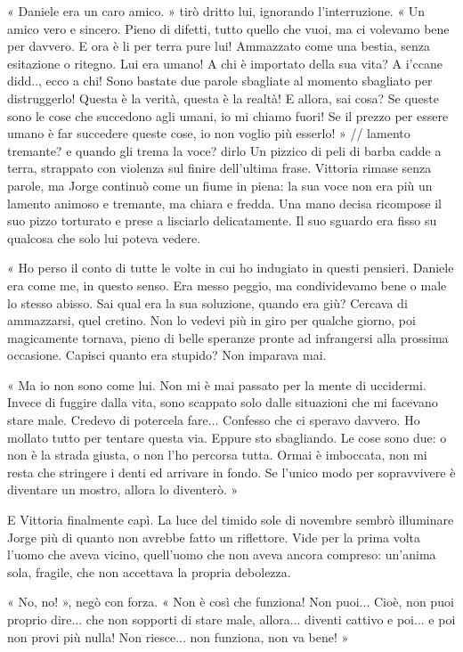 « Daniele era un caro amico. » tirò dritto lui, ignorando l'interruzione. « Un amico vero e sincero. Pieno di difetti, tutto quello che vuoi, ma ci volevamo bene per davvero. E ora è li per terra pure lui! Ammazzato come una bestia, senza esitazione o ritegno. Lui era umano! A chi è importato della sua vita? A i'ccane didd.., ecco a chi! Sono bastate due parole sbagliate al momento sbagliato per distruggerlo! Questa è la verità, questa è la realtà! E allora, sai cosa? Se queste sono le cose che succedono agli umani, io mi chiamo fuori! Se il prezzo per essere umano è far succedere queste cose, io non voglio più esserlo! »
// lamento tremante? e quando gli trema la voce? dirlo
Un pizzico di peli di barba cadde a terra, strappato con violenza sul finire dell'ultima frase. Vittoria rimase senza parole, ma Jorge continuò come un fiume in piena: la sua voce non era più un lamento animoso e tremante, ma chiara e fredda. Una mano decisa ricompose il suo pizzo torturato e prese a lisciarlo delicatamente. Il suo sguardo era fisso su qualcosa che solo lui poteva vedere.

« Ho perso il conto di tutte le volte in cui ho indugiato in questi pensieri. Daniele era come me, in questo senso. Era messo peggio, ma condividevamo bene o male lo stesso abisso. Sai qual era la sua soluzione, quando era giù? Cercava di ammazzarsi, quel cretino. Non lo vedevi più in giro per qualche giorno, poi magicamente tornava, pieno di belle speranze pronte ad infrangersi alla prossima occasione. Capisci quanto era stupido? Non imparava mai.

« Ma io non sono come lui. Non mi è mai passato per la mente di uccidermi. Invece di fuggire dalla vita, sono scappato solo dalle situazioni che mi facevano stare male. Credevo di potercela fare... Confesso che ci speravo davvero. Ho mollato tutto per tentare questa via. Eppure sto sbagliando. Le cose sono due: o non è la strada giusta, o non l'ho percorsa tutta. Ormai è imboccata, non mi resta che stringere i denti ed arrivare in fondo. Se l'unico modo per sopravvivere è diventare un mostro, allora lo diventerò. »

E Vittoria finalmente capì. La luce del timido sole di novembre sembrò illuminare Jorge più di quanto non avrebbe fatto un riflettore. Vide per la prima volta l'uomo che aveva vicino, quell'uomo che non aveva ancora compreso: un'anima sola, fragile, che non accettava la propria debolezza.

« No, no! », negò con forza. « Non è così che funziona! Non puoi... Cioè, non puoi proprio dire... che non sopporti di stare male, allora... diventi cattivo e poi... e poi non provi più nulla! Non riesce... non funziona, non va bene! »

